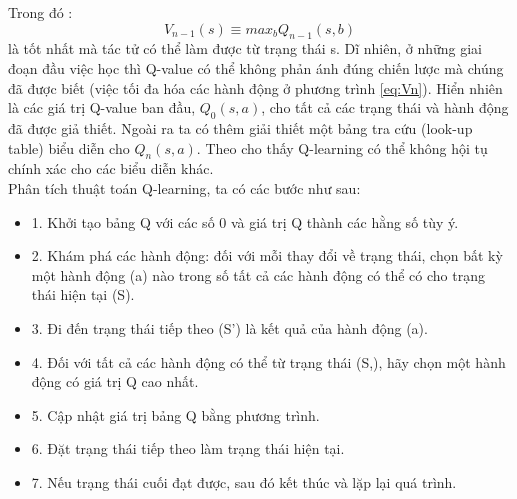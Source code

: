 Trong đó :
\begin{equation} 
    \label{eq:Vn}
    V_{n-1}(s) \equiv max_{b} {Q_{n-1}(s,b)}
\end{equation}
là tốt nhất mà tác tử có thể làm được từ trạng thái s. Dĩ nhiên, ở những giai đoạn đầu việc học thì Q-value có thể không phản ánh 
đúng chiến lược mà chúng đã được biết (việc tối đa hóa các hành động ở phương trình \ref{eq:Vn}). 
Hiển nhiên là các giá trị Q-value ban đầu, $Q_{0}(s,a)$, cho tất cả các trạng thái và hành động đã được giả thiết. Ngoài ra ta có thêm 
giải thiết một bảng tra cứu (look-up table) biểu diễn cho $Q_n(s,a)$. 
Theo  \cite{Watkins1989} cho thấy Q-learning có thể không hội tụ chính xác cho các biểu diễn khác.\\
\indent Phân tích thuật toán Q-learning, ta có các bước như sau:
\begin{itemize}
    \item 1. Khởi tạo bảng Q với các số 0 và giá trị Q thành các hằng số tùy ý.
    \item 2. Khám phá các hành động: đối với mỗi thay đổi về trạng thái, chọn bất 
    kỳ một hành động (a) nào trong số tất cả các hành động có thể có cho trạng thái 
    hiện tại (S).
    \item 3. Đi đến trạng thái tiếp theo (S') là kết quả của hành động (a).
    \item 4. Đối với tất cả các hành động có thể từ trạng thái (S,), hãy chọn một hành 
    động có giá trị Q cao nhất.
    \item 5. Cập nhật giá trị bảng Q bằng phương trình.
    \item 6. Đặt trạng thái tiếp theo làm trạng thái hiện tại.
    \item 7. Nếu trạng thái cuối đạt được, sau đó kết thúc và lặp lại quá trình.
\end{itemize}
